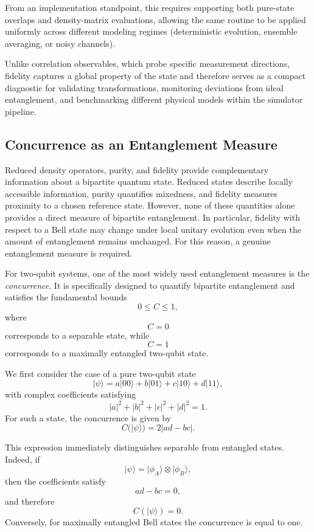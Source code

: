 \documentclass[a4paper]{article}
\begin{document}
From an implementation standpoint, this requires supporting both pure-state overlaps and density-matrix evaluations, allowing the same routine to be applied uniformly across different modeling regimes (deterministic evolution, ensemble averaging, or noisy channels). 

Unlike correlation observables, which probe specific measurement directions, fidelity captures a global property of the state and therefore serves as a compact diagnostic for validating transformations, monitoring deviations from ideal entanglement, and benchmarking different physical models within the simulator pipeline.

\subsection{Concurrence as an Entanglement Measure}

Reduced density operators, purity, and fidelity provide complementary information about a bipartite quantum state. Reduced states describe locally accessible information, purity quantifies mixedness, and fidelity measures proximity to a chosen reference state. However, none of these quantities alone provides a direct measure of bipartite entanglement. In particular, fidelity with respect to a Bell state may change under local unitary evolution even when the amount of entanglement remains unchanged. For this reason, a genuine entanglement measure is required.

For two-qubit systems, one of the most widely used entanglement measures is the \emph{concurrence}. It is specifically designed to quantify bipartite entanglement and satisfies the fundamental bounds
\[
0 \le C \le 1,
\]
where
\[
C = 0
\]
corresponds to a separable state, while
\[
C = 1
\]
corresponds to a maximally entangled two-qubit state.

\medskip

We first consider the case of a pure two-qubit state
\[
|\psi\rangle
=
a|00\rangle + b|01\rangle + c|10\rangle + d|11\rangle,
\]
with complex coefficients satisfying
\[
|a|^2 + |b|^2 + |c|^2 + |d|^2 = 1.
\]
For such a state, the concurrence is given by
\[
C(|\psi\rangle) = 2|ad - bc|.
\]

This expression immediately distinguishes separable from entangled states. Indeed, if
\[
|\psi\rangle = |\phi_A\rangle \otimes |\phi_B\rangle,
\]
then the coefficients satisfy
\[
ad - bc = 0,
\]
and therefore
\[
C(|\psi\rangle)=0.
\]
Conversely, for maximally entangled Bell states the concurrence is equal to one.
\end{document}
